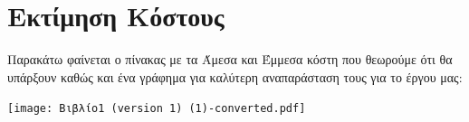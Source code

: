 \documentclass[12pt,a4paper,oneside]{article}
\begin{document}
\section{Εκτίμηση Κόστους}\label{sec:res}
Παρακάτω φαίνεται ο πίνακας με τα Άμεσα και Έμμεσα κόστη που θεωρούμε ότι θα υπάρξουν καθώς και ένα γράφημα για καλύτερη αναπαράσταση τους για το έργου μας:
\centerline{\texttt{[image: Βιβλίο1 (version 1) (1)-converted.pdf]}}


\newpage



\end{document}
